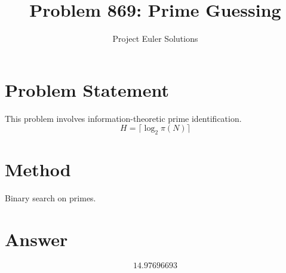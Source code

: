 \documentclass[11pt]{article}
\title{Problem 869: Prime Guessing}
\author{Project Euler Solutions}
\date{}
\begin{document}
\maketitle
\section{Problem Statement}
This problem involves information-theoretic prime identification.
\[
H = \lceil\log_2 \pi(N)\rceil
\]
\section{Method}
Binary search on primes.
\section{Answer}

\[
\boxed{14.97696693}
\]
\end{document}
